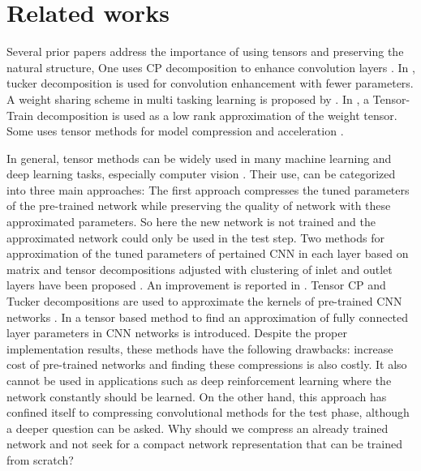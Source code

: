 \documentclass{article}
\begin{document}
\section{Related works}
\label{sec:related-works}

Several prior papers address the importance of using tensors and preserving the natural structure, One uses CP decomposition to enhance convolution layers \cite{r8}. In \cite{r9}, tucker decomposition is used for convolution enhancement with fewer parameters. A weight sharing scheme in multi tasking learning is proposed by \cite{r10}. In \cite{r11}, a Tensor-Train decomposition is used as a low rank approximation of the weight tensor. Some uses tensor methods for model compression and acceleration \cite{r21}. 

In general, tensor methods can be widely used in many machine learning and deep learning tasks, especially computer vision \cite{r22}. Their use, can be categorized into three  main approaches: The first approach compresses the tuned parameters of the pre-trained network while preserving the quality of network with these approximated parameters. So here the new network is not trained and the approximated network could only be used in the test step. Two methods for approximation of the tuned parameters of pertained CNN in each layer based on matrix and tensor decompositions adjusted with clustering of inlet and outlet layers have been proposed \cite{r23}. An improvement is reported in \cite{r24}. Tensor CP and Tucker decompositions are used to approximate the kernels of pre-trained CNN networks \cite{r25} \cite{r26} \cite{r27}. In \cite{r27} a tensor based method to find an approximation of fully connected layer parameters in CNN networks is introduced. Despite the proper implementation results, these methods have the following drawbacks: increase cost of pre-trained networks and finding these compressions is also costly. It also cannot be used in applications such as deep reinforcement learning where the network constantly should be learned. On the other hand, this approach has confined itself to compressing convolutional methods for the test phase, although a deeper question can be asked. Why should we compress an already trained network and not seek for a compact network representation that can be trained from scratch? 
\end{document}
